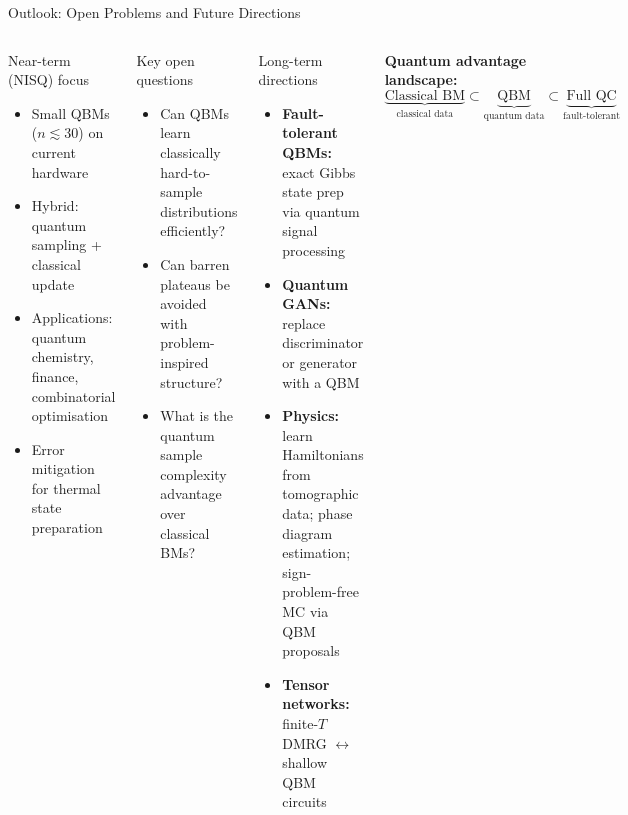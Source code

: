 \documentclass[aspectratio=169,10pt]{beamer}
\begin{document}
\begin{frame}{Outlook: Open Problems and Future Directions}
  \begin{columns}[T]
      \begin{block}{Near-term (NISQ) focus}
        \begin{itemize}\itemsep1pt
          \item Small QBMs ($n\lesssim 30$) on current hardware
          \item Hybrid: quantum sampling + classical update
          \item Applications: quantum chemistry, finance,
                combinatorial optimisation
          \item Error mitigation for thermal state preparation
        \end{itemize}
      \end{block}
      \vspace{0.1cm}
      \begin{alertblock}{Key open questions}
        \begin{itemize}\itemsep1pt
          \item Can QBMs learn classically hard-to-sample
                distributions efficiently?
          \item Can barren plateaus be avoided with
                problem-inspired structure?
          \item What is the quantum sample complexity
                advantage over classical BMs?
        \end{itemize}
      \end{alertblock}
      \begin{block}{Long-term directions}
        \begin{itemize}\itemsep1pt
          \item \textbf{Fault-tolerant QBMs:} exact Gibbs
                state prep via quantum signal processing
          \item \textbf{Quantum GANs:} replace discriminator
                or generator with a QBM
          \item \textbf{Physics:} learn Hamiltonians from
                tomographic data; phase diagram estimation;
                sign-problem-free MC via QBM proposals
          \item \textbf{Tensor networks:}
                finite-$T$ DMRG $\leftrightarrow$
                shallow QBM circuits
        \end{itemize}
      \end{block}
      \vspace{0.1cm}
      \textbf{Quantum advantage landscape:}
      \[
        \underbrace{\text{Classical BM}}_{\text{classical data}}
        \subset
        \underbrace{\text{QBM}}_{\text{quantum data}}
        \subset
        \underbrace{\text{Full QC}}_{\text{fault-tolerant}}
      \]
  \end{columns}
\end{frame}
\end{document}
